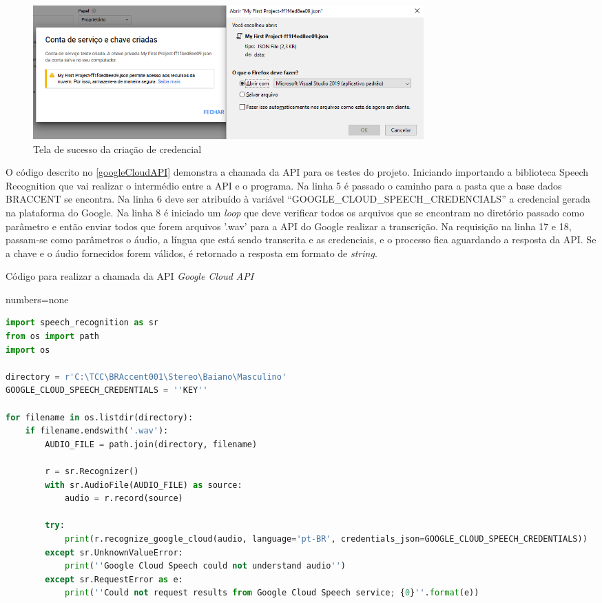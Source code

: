 \begin{figure}[h!]
\centering
\caption{Tela de sucesso da criação de credencial}
\label{chaveCriada}
\includegraphics[width=150mm]{images/ConfigurarGoogle/chaveCriada.PNG}
\end{figure}

\FloatBarrier

O código descrito no \autoref{googleCloudAPI} demonstra a chamada da API para os testes do projeto. Iniciando importando a biblioteca Speech Recognition que vai realizar o intermédio entre a API e o programa. Na linha 5 é passado o caminho para a pasta que a base dados BRACCENT se encontra. Na linha 6 deve ser atribuído à variável ``GOOGLE\_CLOUD\_SPEECH\_CREDENCIALS'' a credencial gerada na plataforma do Google. Na linha 8 é iniciado um \textit{loop} que deve verificar todos os arquivos que se encontram no diretório passado como parâmetro e então enviar todos que forem arquivos '.wav' para a API do Google realizar a transcrição. Na requisição na linha 17 e 18, passam-se como parâmetros o áudio, a língua que está sendo transcrita e as credenciais, e o processo fica aguardando a resposta da API. Se a chave e o áudio fornecidos forem válidos, é retornado a resposta em formato de \textit{string}. 

\begin{quadro}[h!]
\centering
\caption{Código para realizar a chamada da API \emph{Google Cloud API}}
\label{googleCloudAPI}
{numbers=none}
\begin{lstlisting}[language=Python]
import speech_recognition as sr
from os import path
import os

directory = r'C:\TCC\BRAccent001\Stereo\Baiano\Masculino'
GOOGLE_CLOUD_SPEECH_CREDENTIALS = ''KEY''

for filename in os.listdir(directory):
    if filename.endswith('.wav'):
        AUDIO_FILE = path.join(directory, filename)

        r = sr.Recognizer()
        with sr.AudioFile(AUDIO_FILE) as source:
            audio = r.record(source)
            
        try:
            print(r.recognize_google_cloud(audio, language='pt-BR', credentials_json=GOOGLE_CLOUD_SPEECH_CREDENTIALS))
        except sr.UnknownValueError:
            print(''Google Cloud Speech could not understand audio'')
        except sr.RequestError as e:
            print(''Could not request results from Google Cloud Speech service; {0}''.format(e))
\end{lstlisting}
\end{quadro}

